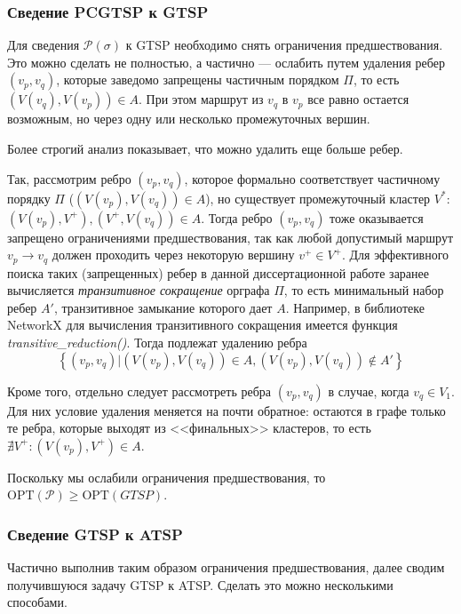 \subsubsection{Сведение PCGTSP к GTSP}

Для сведения
$\mathcal P(\sigma)$
к GTSP
необходимо снять ограничения предшествования.
Это можно сделать не полностью, а частично ---
ослабить
путем удаления ребер
$(v_p, v_q)$, которые заведомо запрещены
частичным порядком $\Pi$,
то есть
$(V(v_q), V(v_p))\in A$.
При этом маршрут из $v_q$ в $v_p$
все равно остается возможным,
но через одну или несколько промежуточных вершин.

Более строгий анализ показывает,
что можно удалить еще больше ребер.

Так, рассмотрим ребро
$(v_p, v_q)$,
которое формально соответствует частичному порядку $\Pi$
($(V(v_p), V(v_q))\in A$),
но существует промежуточный кластер $V^*$:
$(V(v_p), V^+), (V^+, V(v_q))\in A$.
Тогда ребро
$(v_p, v_q)$
тоже оказывается запрещено ограничениями предшествования,
так как любой допустимый маршрут
$v_p \to v_q$
должен проходить через некоторую вершину
$v^+ \in V^+$.
Для эффективного поиска таких
(запрещенных)
ребер
в данной диссертационной работе
заранее вычисляется
\textit{транзитивное сокращение}
орграфа $\Pi$,
то есть минимальный набор ребер
$A'$,
транзитивное замыкание которого дает $A$.
Например, в библиотеке NetworkX \cite{bi:NetworkX}
для вычисления транзитивного сокращения
имеется функция \textit{transitive\_reduction()}.
Тогда подлежат удалению ребра
$$
\left\{(v_p, v_q)|
  (V(v_p), V(v_q))\in A, (V(v_p), V(v_q))\notin A'\right\}
$$

Кроме того, отдельно следует рассмотреть ребра
$(v_p, v_q)$
в случае, когда
$v_q\in V_1$.
Для них условие удаления меняется на почти обратное:
остаются в графе только те ребра,
которые выходят из <<финальных>> кластеров,
то есть
$\nexists V^+ \colon (V(v_p), V^+)\in A$.

Поскольку мы ослабили ограничения предшествования,
то
$\mathrm{OPT}(\mathcal P) \geqslant \mathrm{OPT}(GTSP)$.

\subsubsection{Сведение GTSP к ATSP}
Частично выполнив таким образом ограничения предшествования,
далее сводим получившуюся задачу GTSP
к ATSP. Сделать это можно несколькими способами.


